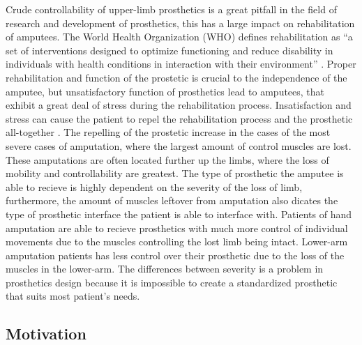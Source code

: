 \documentclass[../main.tex]{subfiles}
\begin{document}
Crude controllability of upper-limb prosthetics is a great pitfall in the field of research and development of prosthetics, this has a large impact on rehabilitation of amputees.
The World Health Organization (WHO) defines rehabilitation as ``a set of interventions designed to optimize functioning and reduce disability in individuals with health conditions in interaction with their environment'' \cite{WHO_rehab}.
Proper rehabilitation and function of the prostetic is crucial to the independence of the amputee, but unsatisfactory function of prosthetics lead to amputees, that exhibit a great deal of stress during the rehabilitation process.
Insatisfaction and stress can cause the patient to repel the rehabilitation process and the prosthetic all-together \cite{Kristin2012}.
The repelling of the prostetic increase in the cases of the most severe cases of amputation, where the largest amount of control muscles are lost.
These amputations are often located further up the limbs, where the loss of mobility and controllability are greatest.
The type of prosthetic the amputee is able to recieve is highly dependent on the severity of the loss of limb, furthermore, the amount of muscles leftover from amputation also dicates the type of prosthetic interface the patient is able to interface with.
Patients of hand amputation are able to recieve prosthetics with much more control of individual movements due to the muscles controlling the lost limb being intact. 
Lower-arm amputation patients has less control over their prosthetic due to the loss of the muscles in the lower-arm.
The differences between severity is a problem in prosthetics design because it is impossible to create a standardized prosthetic that suits most patient's needs.




\newpage
\subsection{Motivation}
\end{document}

